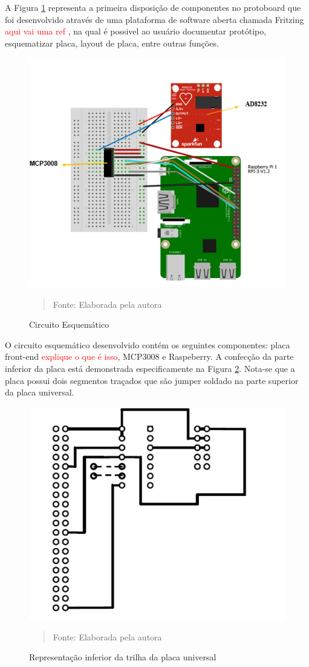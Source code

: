\documentclass[12pt, a4paper]{article}
\begin{document}
A Figura \ref{fig:lop} representa a primeira disposição de componentes no protoboard que foi desenvolvido através de uma plataforma de software aberta chamada Fritzing \textcolor{red}{aqui vai uma ref} , na qual é possivel ao usuário documentar protótipo, esquematizar placa, layout de placa, entre outras funções. 
\begin{figure}[H]
\begin{center}
			\caption{Circuito Esquemático}
			\includegraphics[width=.6\textwidth]{Figuras/PROT.PNG}
			 \vspace*{\fill} 
            \begin{quote} 
            \centering 
           Fonte: {Elaborada pela autora}
            \end{quote}
            \vspace*{\fill}
			\label{fig:lop}
\end{center}
\end{figure}
O circuito esquemático desenvolvido contém os seguintes componentes: placa front-end \textcolor{red}{explique o que é isso}, MCP3008 e Raspeberry. A confecção da parte inferior da placa está demonstrada especificamente na Figura \ref{fig:esque}. Nota-se que a placa possui dois segmentos traçados que são jumper soldado na parte superior da placa universal.
\begin{figure}[H]
\begin{center}
			\caption{Representação inferior da trilha da placa universal}
			\includegraphics[width=.5\textwidth]{Figuras/ofic.png}
               \vspace*{\fill} 
            \begin{quote} 
            \centering 
           Fonte: Elaborada pela autora

            \end{quote}
            \vspace*{\fill}
			\label{fig:esque}
\end{center}
\end{figure}
\end{document}
